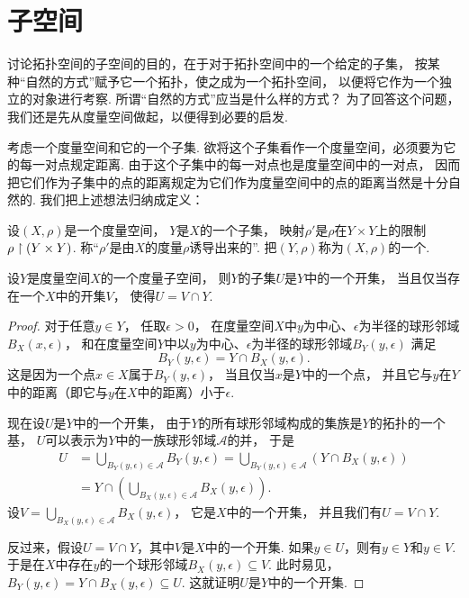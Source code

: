 \section{子空间}
讨论拓扑空间的子空间的目的，在于对于拓扑空间中的一个给定的子集，
按某种“自然的方式”赋予它一个拓扑，使之成为一个拓扑空间，
以便将它作为一个独立的对象进行考察.
所谓“自然的方式”应当是什么样的方式？
为了回答这个问题，我们还是先从度量空间做起，以便得到必要的启发.

考虑一个度量空间和它的一个子集.
欲将这个子集看作一个度量空间，必须要为它的每一对点规定距离.
由于这个子集中的每一对点也是度量空间中的一对点，
因而把它们作为子集中的点的距离规定为它们作为度量空间中的点的距离当然是十分自然的.
我们把上述想法归纳成定义：
\begin{definition}
设\((X,\rho)\)是一个度量空间，
\(Y\)是\(X\)的一个子集，
映射\(\rho'\)是\(\rho\)在\(Y \times Y\)上的限制\(\rho \upharpoonright (Y \times Y)\).
称“\(\rho'\)是由\(X\)的度量\(\rho\)诱导出来的”.
把\((Y,\rho)\)称为\((X,\rho)\)的一个.
\end{definition}

\begin{theorem}\label{theorem:子空间.度量子空间中的开集}
设\(Y\)是度量空间\(X\)的一个度量子空间，
则\(Y\)的子集\(U\)是\(Y\)中的一个开集，
当且仅当存在一个\(X\)中的开集\(V\)，
使得\(U = V \cap Y\).
\begin{proof}
对于任意\(y \in Y\)，
任取\(\epsilon>0\)，
在度量空间\(X\)中\(y\)为中心、\(\epsilon\)为半径的球形邻域\(B_X(x,\epsilon)\)，
和在度量空间\(Y\)中以\(y\)为中心、\(\epsilon\)为半径的球形邻域\(B_Y(y,\epsilon)\)
满足\begin{equation*}
	B_Y(y,\epsilon)
	= Y \cap B_X(y,\epsilon).
\end{equation*}
这是因为一个点\(x \in X\)属于\(B_Y(y,\epsilon)\)，
当且仅当\(x\)是\(Y\)中的一个点，
并且它与\(y\)在\(Y\)中的距离（即它与\(y\)在\(X\)中的距离）小于\(\epsilon\).

现在设\(U\)是\(Y\)中的一个开集，
由于\(Y\)的所有球形邻域构成的集族是\(Y\)的拓扑的一个基，
\(U\)可以表示为\(Y\)中的一族球形邻域\(\mathscr{A}\)的并，
于是\begin{align*}
	U &= \bigcup_{B_Y(y,\epsilon) \in \mathscr{A}} B_Y(y,\epsilon)
	= \bigcup_{B_Y(y,\epsilon) \in \mathscr{A}} \left( Y \cap B_X(y,\epsilon) \right) \\
	&= Y \cap \left( \bigcup_{B_X(y,\epsilon) \in \mathscr{A}} B_X(y,\epsilon) \right).
\end{align*}
设\(V = \bigcup_{B_X(y,\epsilon) \in \mathscr{A}} B_X(y,\epsilon)\)，
它是\(X\)中的一个开集，
并且我们有\(U = V \cap Y\).

反过来，假设\(U = V \cap Y\)，其中\(V\)是\(X\)中的一个开集.
如果\(y \in U\)，则有\(y \in Y\)和\(y \in V\).
于是在\(X\)中存在\(y\)的一个球形邻域\(B_X(y,\epsilon) \subseteq V\).
此时易见，\(B_Y(y,\epsilon) = Y \cap B_X(y,\epsilon) \subseteq U\).
这就证明\(U\)是\(Y\)中的一个开集.
\end{proof}
\end{theorem}

